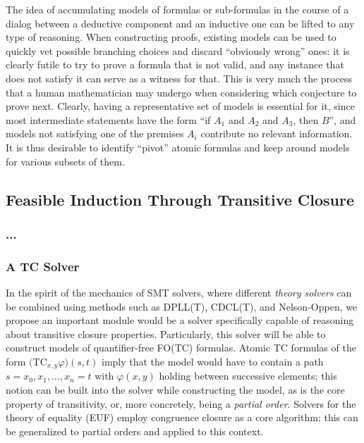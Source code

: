 The idea of accumulating models of formulas or sub-formulas in the course of
a dialog between a deductive component and an inductive one can be lifted to
any type of reasoning.
When constructing proofs, existing models can be used to quickly vet possible
branching choices and discard ``obviously wrong'' ones: it is clearly futile
to try to prove a formula that is not valid, and any instance that does not
satisfy it can serve as a witness for that.
This is very much the process that a human mathematician may undergo when
considering which conjecture to prove next.
Clearly, having a representative set of models is essential for it, since
most intermediate statements have the form ``if $A_1$ and $A_2$ and $A_3$, then
$B$'', and models not satisfying one of the premises $A_i$ contribute no
relevant information.
It is thus desirable to identify ``pivot'' atomic formulas and keep around
models for various subsets of them.


\subsection{Feasible Induction Through Transitive Closure}

\subsubsection{...}

\subsubsection{A TC Solver}

In the spirit of the mechanics of SMT solvers, where different \emph{theory solvers}
can be combined using methods such as DPLL(T), CDCL(T), and Nelson-Oppen, we
propose an important module would be a solver specifically capable of reasoning
about transitive closure properties.
Particularly, this solver will be able to construct models of quantifier-free
FO(TC) formulas.
Atomic TC formulas of the form $\big(\mathrm{TC}_{x,y}\varphi\big)(s,t)$ imply that
the model would have to contain a path $s=x_0,x_1,\ldots,x_n=t$ with $\varphi(x,y)$
holding between successive elements; this notion can be built into the solver
while constructing the model, as is the core property of transitivity, or,
more concretely, being a \emph{partial order}.
Solvers for the theory of equality (EUF) employ congruence closure as a core
algorithm; this can be generalized to partial orders and applied to this
context.


